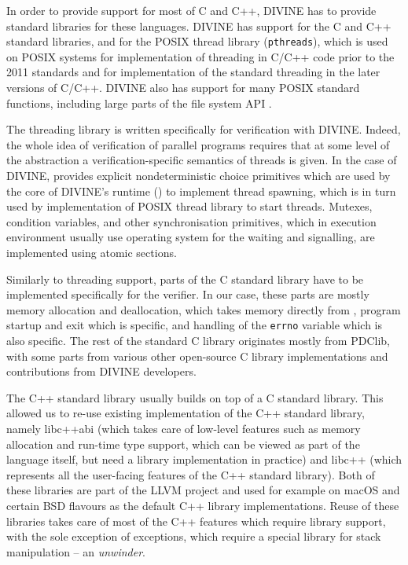 In order to provide support for most of C and C++, DIVINE has to provide standard libraries for these languages.
DIVINE has support for the C and C++ standard libraries, and for the POSIX
thread library (\texttt{pthreads}), which is used on POSIX systems for
implementation of threading in C/C++ code prior to the 2011 standards and for
implementation of the standard threading in the later versions of C/C++.
DIVINE also has support for many POSIX standard functions, including large parts of the file system API .

The threading library is written specifically for verification with DIVINE.
Indeed, the whole idea of verification of parallel programs requires that at some level of the abstraction a verification-specific semantics of threads is given.
In the case of DIVINE, \divm provides explicit nondeterministic choice primitives which are used by the core of DIVINE's runtime (\dios) to implement thread spawning, which is in turn used by implementation of POSIX thread library to start threads.
Mutexes, condition variables, and other synchronisation primitives, which in
execution environment usually use operating system for the waiting and
signalling, are implemented using atomic sections.

Similarly to threading support, parts of the C standard library have to be
implemented specifically for the verifier.
In our case, these parts are mostly memory allocation and deallocation, which
takes memory directly from \divm, program startup and exit which is \dios specific, and handling of the \texttt{errno} variable which is also \dios specific.
The rest of the standard C library originates mostly from PDClib, with some parts from various other open-source C library implementations and contributions from DIVINE developers.

The C++ standard library usually builds on top of a C standard library.
This allowed us to re-use existing implementation of the C++ standard library,
namely libc++abi (which takes care of low-level features such as
memory allocation and run-time type support, which can be viewed as part of the
language itself, but need a library implementation in practice) and
libc++ (which represents all the user-facing features of the C++
standard library).
Both of these libraries are part of the LLVM project and used for example on
macOS and certain BSD flavours as the default C++ library implementations.
Reuse of these libraries takes care of most of the C++ features which require
library support, with the sole exception of exceptions, which require a special
library for stack manipulation -- an \emph{unwinder}.

